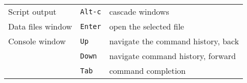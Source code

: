 \documentclass{article}
\begin{document}
\begin{center}
\begin{tabular}{p{}lp{}}
Script output & \texttt{Alt-c} & cascade windows \\[6pt]

Data files window & \texttt{Enter} & open the selected file \\[6pt]

Console window & \texttt{Up} & navigate the command history, back \\
 & \texttt{Down} & navigate command history, forward \\
 & \texttt{Tab} & command completion \\

\end{tabular}
\end{center}
\end{document}
